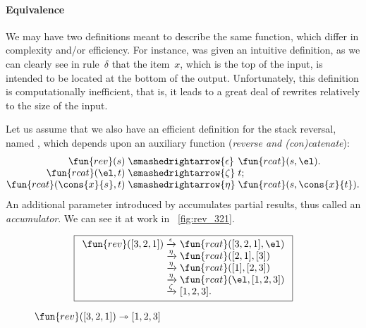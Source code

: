 \paragraph{Equivalence}

We may have two definitions meant to describe the same function, which
differ in complexity and/or efficiency. For instance,
 was given an intuitive
definition, as we can clearly see in rule~\(\delta\) that the
item~\(x\), which is the top of the input, is intended to be located
at the bottom of the output. Unfortunately, this definition is
computationally inefficient, that is, it leads to a great deal of
rewrites relatively to the size of the input.

Let us assume that we also have an efficient definition for the stack
reversal, named , which depends upon
an auxiliary function
(\emph{reverse and (con)catenate}):
\begin{equation}
  \begin{array}{@{}r@{\;}l@{\;}l@{}}
    \fun{rev}(s) & \smashedrightarrow{\epsilon} & \fun{rcat}(s,\el).\\
    \fun{rcat}(\el,t) & \smashedrightarrow{\zeta} & t;\\
    \fun{rcat}(\cons{x}{s},t) & \smashedrightarrow{\eta} &
    \fun{rcat}(s,\cons{x}{t}).
  \end{array}
  \label{def:rev}
\end{equation}
An additional parameter introduced by  accumulates partial
results, thus called an \emph{accumulator}. We can see it at work in
\fig~\vref{fig:rev_321}.
\begin{figure}
\begin{equation*}
\boxed{%
\begin{array}{r@{\;}l@{\;}l}
\fun{rev}([3,2,1])
& \xrightarrow{\smash{\epsilon}} & \fun{rcat}([3,2,1],\el)\\
& \xrightarrow{\smash{\eta}}     & \fun{rcat}([2,1],[3])\\
& \xrightarrow{\smash{\eta}}     & \fun{rcat}([1],[2,3])\\
& \xrightarrow{\smash{\eta}}     & \fun{rcat}(\el,[1,2,3])\\
& \xrightarrow{\smash{\zeta}}    & [1,2,3].
\end{array}}
\end{equation*}
\caption{\(\fun{rev}([3,2,1]) \twoheadrightarrow [1,2,3]\)}
\label{fig:rev_321}
\end{figure}

